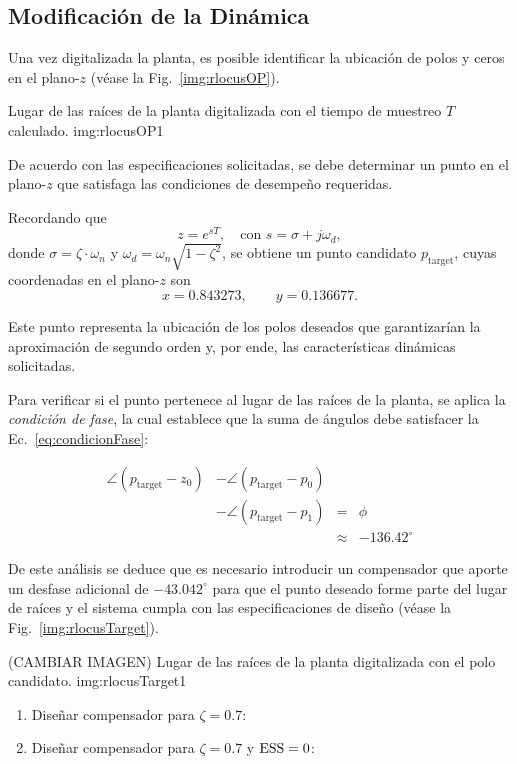 \subsection{Modificaci\'on de la Din\'amica}

Una vez digitalizada la planta, es posible identificar la ubicaci\'on de polos y ceros en el plano-$z$ (v\'ease la Fig.~\ref{img:rlocusOP}).  

{Lugar de las ra\'ices de la planta digitalizada con el tiempo de muestreo $T$ calculado.}
{img:rlocusOP}{1}

De acuerdo con las especificaciones solicitadas, se debe determinar un punto en el plano-$z$ que satisfaga las condiciones de desempe\~no requeridas.  

Recordando que 
\[
z = e^{sT}, \quad \text{con } s = \sigma + j\omega_d,
\]
donde $\sigma = \zeta \cdot \omega_n$ y $\omega_d = \omega_n \sqrt{1-\zeta^2}$,
se obtiene un punto candidato $p_{\text{target}}$, cuyas coordenadas en el plano-$z$ son
\[
x = 0.843273, \qquad y = 0.136677.
\]

Este punto representa la ubicaci\'on de los polos deseados que garantizar\'ian la aproximaci\'on de segundo orden y, por ende, las caracter\'isticas din\'amicas solicitadas.  

Para verificar si el punto pertenece al lugar de las ra\'ices de la planta, se aplica la \emph{condici\'on de fase}, la cual establece que la suma de \'angulos debe satisfacer la Ec.~\eqref{eq:condicionFase}:

\begin{equation}
	\begin{aligned}
		\angle (p_{\text{target}}-z_0) 
		&- \angle (p_{\text{target}}-p_0) \\
		&- \angle (p_{\text{target}}-p_1) 
		&=& \phi \\&&\approx& -136.42^\circ
	\end{aligned}
	\label{eq:condicionFase}
\end{equation}

De este an\'alisis se deduce que es necesario introducir un compensador que aporte un desfase adicional de $-43.042^\circ$ para que el punto deseado forme parte del lugar de ra\'ices y el sistema cumpla con las especificaciones de dise\~no (v\'ease la Fig.~\ref{img:rlocusTarget}).  

(CAMBIAR IMAGEN)
{Lugar de las ra\'ices de la planta digitalizada con el polo candidato.}
{img:rlocusTarget}{1}

\begin{enumerate}[label=3.\arabic*.]
	\item Diseñar compensador para $\zeta = 0.7$: 
	
	\item Diseñar compensador para $\zeta = 0.7$ y $\mathrm{ESS} = 0$: 
	
\end{enumerate}